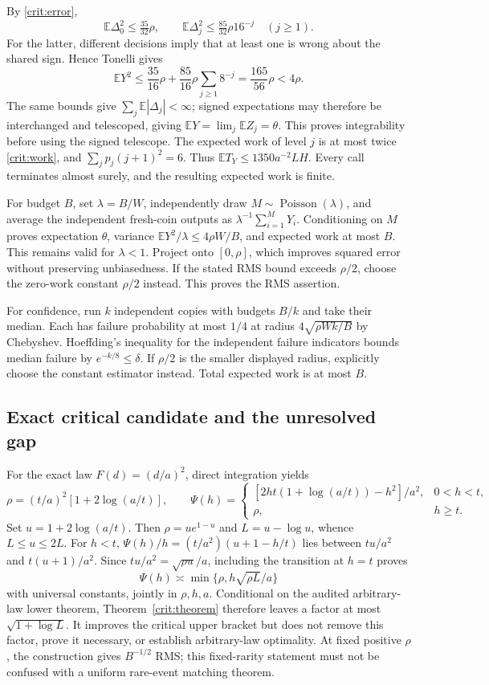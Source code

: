 By \eqref{crit:error},
\[
 \mathbb E\Delta_0^2\le\tfrac{35}{32}\rho,\qquad
 \mathbb E\Delta_j^2\le\tfrac{85}{32}\rho16^{-j}\quad(j\ge1).
\]
For the latter, different decisions imply that at least one is wrong about
the shared sign. Hence Tonelli gives
\[
 \mathbb EY^2\le\frac{35}{16}\rho+
      \frac{85}{16}\rho\sum_{j\ge1}8^{-j}
   =\frac{165}{56}\rho<4\rho.
\]
The same bounds give $\sum_j\mathbb E|\Delta_j|<\infty$; signed
expectations may therefore be interchanged and telescoped, giving
$\mathbb EY=\lim_j\mathbb EZ_j=\theta$. This proves integrability before
using the signed telescope. The expected work of level $j$ is at most twice
\eqref{crit:work}, and
$\sum_jp_j(j+1)^2=6$. Thus $\mathbb ET_Y\le1350a^{-2}LH$.
Every call terminates almost surely, and the resulting expected work is finite.

For budget $B$, set $\lambda=B/W$, independently draw
$M\sim\operatorname{Poisson}(\lambda)$, and average the independent fresh-coin
outputs as $\lambda^{-1}\sum_{i=1}^M Y_i$. Conditioning on $M$ proves
expectation $\theta$, variance $\mathbb EY^2/\lambda\le4\rho W/B$, and
expected work at most $B$. This remains valid for $\lambda<1$. Project onto
$[0,\rho]$, which improves squared error without preserving unbiasedness.
If the stated RMS bound exceeds $\rho/2$, choose the zero-work constant
$\rho/2$ instead. This proves the RMS assertion.

For confidence, run $k$ independent copies with budgets $B/k$ and take their
median. Each has failure probability at most $1/4$ at radius
$4\sqrt{\rho Wk/B}$ by Chebyshev. Hoeffding's inequality for the independent
failure indicators bounds median failure by $e^{-k/8}\le\delta$. If
$\rho/2$ is the smaller displayed radius, explicitly choose the constant
estimator instead. Total expected work is at most $B$.

\subsection{Exact critical candidate and the unresolved gap}
For the exact law $F(d)=(d/a)^2$, direct integration yields
\[
 \rho=(t/a)^2[1+2\log(a/t)],\qquad
 \Psi(h)=\begin{cases}
 [2ht(1+\log(a/t))-h^2]/a^2,&0<h<t,\\
 \rho,&h\ge t.
 \end{cases}
\]
Set $u=1+2\log(a/t)$. Then $\rho=u e^{1-u}$ and
$L=u-\log u$, whence $L\le u\le2L$. For $h<t$,
$\Psi(h)/h=(t/a^2)(u+1-h/t)$ lies between $tu/a^2$ and
$t(u+1)/a^2$. Since $tu/a^2=\sqrt{\rho u}/a$, including the transition
at $h=t$ proves
\[
 \Psi(h)\asymp\min\{\rho,h\sqrt{\rho L}/a\}
\]
with universal constants, jointly in $\rho,h,a$. Conditional on the audited
arbitrary-law lower theorem, Theorem~\ref{crit:theorem} therefore leaves a
factor at most $\sqrt{1+\log L}$. It improves the critical upper bracket but
does not remove this factor, prove it necessary, or establish arbitrary-law
optimality. At fixed positive $\rho$, the construction gives $B^{-1/2}$ RMS;
this fixed-rarity statement must not be confused with a uniform rare-event
matching theorem.

